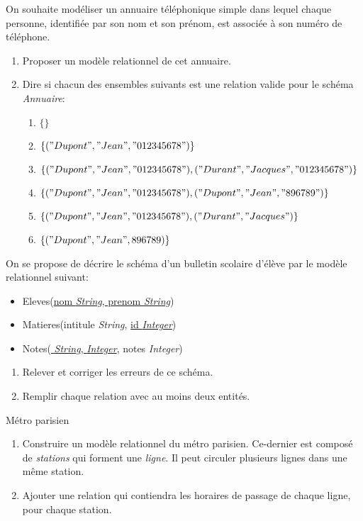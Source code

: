 \documentclass[a4paper,11pt]{article}
\begin{document}
\begin{exo}
On souhaite modéliser un annuaire téléphonique simple dans lequel chaque personne, identifiée par son nom et son prénom, est associée à son numéro de téléphone.
\begin{enumerate}
\item Proposer un modèle relationnel de cet annuaire.
\item Dire si chacun des ensembles suivants est une relation valide pour le schéma \emph{Annuaire}:
\begin{enumerate}
\item $\{\}$
\item $\{("Dupont","Jean","012345678")\}$
\item $\{("Dupont","Jean","012345678"), ("Durant","Jacques","012345678")\}$
\item $\{("Dupont","Jean","012345678"), ("Dupont","Jean","896789")\}$
\item $\{("Dupont","Jean","012345678"), ("Durant","Jacques")\}$
\item $\{("Dupont","Jean",896789)\}$
\end{enumerate}
\end{enumerate}
\end{exo}
\begin{exo}
On se propose de décrire le schéma d'un bulletin scolaire d'élève par le modèle relationnel suivant:
\begin{itemize}
\item Eleves(\underline{nom \emph{String}, prenom \emph{String}})
\item Matieres(intitule \emph{String}, \underline{id \emph{Integer}})
\item Notes(\underline{ \emph{String},  \emph{Integer}}, notes \emph{Integer})
\end{itemize}
\begin{enumerate}
\item Relever et corriger les erreurs de ce schéma.
\item Remplir chaque relation avec au moins deux entités.
\end{enumerate}
\end{exo}
\begin{exo}
Métro parisien
\begin{enumerate}
\item Construire un modèle relationnel du métro parisien. Ce-dernier est composé de \emph{stations} qui forment une \emph{ligne}. Il peut circuler plusieurs lignes dans une même station.
\item Ajouter une relation qui contiendra les horaires de passage de chaque ligne, pour chaque station.
\end{enumerate}

\end{exo}
\end{document}
